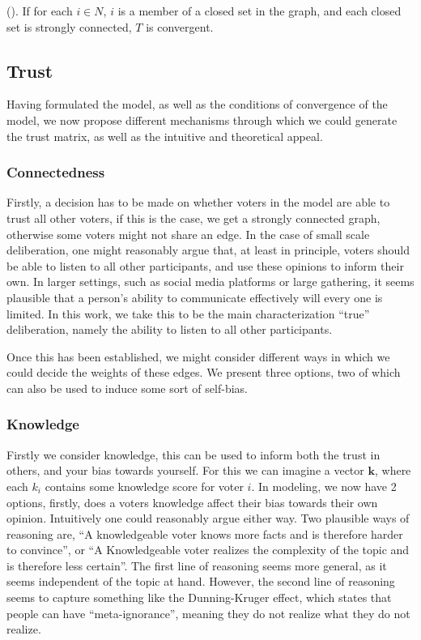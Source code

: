 \begin{proposition}{(\citet{golubNaiveLearningSocial2010}).} If for each \(i
	\in N\), \(i\) is a member of a closed set in the graph, and each closed set is
	strongly connected, \(T\) is convergent. \end{proposition}


\subsection{Trust} Having formulated the model, as well as the conditions of
convergence of the model, we now propose different mechanisms through which we
could generate the trust matrix, as well as the intuitive and theoretical
appeal.

\subsubsection{Connectedness} Firstly, a decision has to be made on whether
voters in the model are able to trust all other voters, if this is the case, we
get a strongly connected graph, otherwise some voters might not share an edge.
In the case of small scale deliberation, one might reasonably argue that, at
least in principle, voters should be able to listen to all other participants,
and use these opinions to inform their own. In larger settings, such as social
media platforms or large gathering, it seems plausible that a person's ability
to communicate effectively will every one is limited. In this work, we take
this to be the main characterization ``true'' deliberation, namely the ability
to listen to all other participants.

Once this has been established, we might consider different ways in which we 
could decide the weights of these edges. We present three options, two of which
can also be used to induce some sort of self-bias.

\subsubsection{Knowledge} Firstly we consider knowledge, this can be used to
inform both the trust in others, and your bias towards yourself. For this we
can imagine a vector $\boldsymbol{k}$, where each $k_i$ contains some knowledge
score for voter $i$. In modeling, we now have 2 options, firstly, does a voters
knowledge affect their bias towards their own opinion. Intuitively one could
reasonably argue either way. Two plausible ways of reasoning are, ``A
knowledgeable voter knows more facts and is therefore harder to convince'', or
``A Knowledgeable voter realizes the complexity of the topic and is therefore
less certain''. The first line of reasoning seems more general, as it seems 
independent of the topic at hand. However, the second line of reasoning seems 
to capture something like the Dunning-Kruger effect, which states that people 
can have ``meta-ignorance'', meaning they do not realize what they do not realize.


